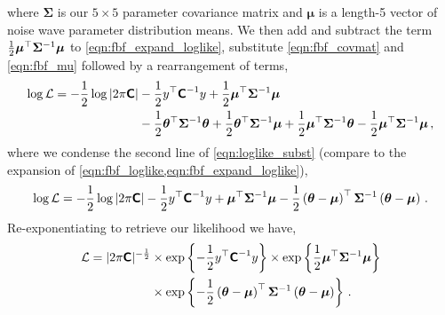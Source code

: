 where $\bm{\Sigma}$ is our $5 \times 5$ parameter covariance matrix and $\boldsymbol{\mu}$ is a length-5 vector of noise wave parameter distribution means. We then add and subtract the term $\frac{1}{2} \boldsymbol{\mu}^{\top} \bm{\Sigma}^{-1} \boldsymbol{\mu}$ to \cref{eqn:fbf_expand_loglike}, substitute \cref{eqn:fbf_covmat} and \cref{eqn:fbf_mu} followed by a rearrangement of terms,
\begin{equation}
    \begin{split}
    \log\mathcal{L} = - \frac{1}{2} \log |2 \pi \textbf{\textsf{C}}| &-\frac{1}{2} y^{\top} \textbf{\textsf{C}}^{-1} y + \frac{1}{2} \boldsymbol{\mu}^{\top} \bm{\Sigma}^{-1} \boldsymbol{\mu} \\
     &-\frac{1}{2} \boldsymbol{\theta}^{\top} \bm{\Sigma}^{-1} \boldsymbol{\theta} + \frac{1}{2} \boldsymbol{\theta}^{\top} \bm{\Sigma}^{-1} \boldsymbol{\mu} + \frac{1}{2} \boldsymbol{\mu}^{\top} \bm{\Sigma}^{-1} \boldsymbol{\theta} - \frac{1}{2} \boldsymbol{\mu}^{\top} \bm{\Sigma}^{-1} \boldsymbol{\mu} \,,
    \label{eqn:loglike_subst}
    \end{split}
\end{equation}
where we condense the second line of \cref{eqn:loglike_subst} (compare to the expansion of \cref{eqn:fbf_loglike,eqn:fbf_expand_loglike}),
\begin{equation}
    \log\mathcal{L} = -\frac{1}{2} \log |2 \pi \textbf{\textsf{C}}| -\frac{1}{2} y^{\top} \textbf{\textsf{C}}^{-1} y + \boldsymbol{\mu}^{\top} \bm{\Sigma}^{-1} \boldsymbol{\mu}  -\frac{1}{2} \left( \boldsymbol{\theta} - \boldsymbol{\mu} \right)^{\top} \bm{\Sigma}^{-1} \left( \boldsymbol{\theta} - \boldsymbol{\mu} \right) \,.
    \label{eqn:condense_fbf_loglike}
\end{equation}
Re-exponentiating to retrieve our likelihood we have,
\begin{equation}
    \begin{split}
    \mathcal{L} = |2 \pi \textbf{\textsf{C}}|^{-\frac{1}{2}} &\times \exp \left\{ -\frac{1}{2} y^{\top} \textbf{\textsf{C}}^{-1} y \right\} \times \exp \left\{ \frac{1}{2} \boldsymbol{\mu}^{\top} \bm{\Sigma}^{-1} \boldsymbol{\mu} \right\} \\
    &\times \exp \left\{ -\frac{1}{2} \left( \boldsymbol{\theta} - \boldsymbol{\mu} \right)^{\top} \bm{\Sigma}^{-1} \left( \boldsymbol{\theta} - \boldsymbol{\mu} \right) \right\} \,.
    \label{eqn:condense_fbf_like_2}
    \end{split}
\end{equation}

